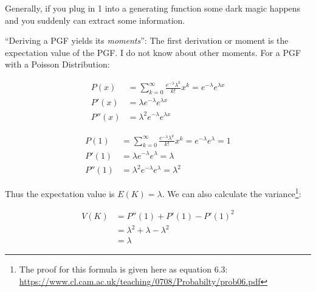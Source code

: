 Generally, if you plug in 1 into a generating function some dark magic happens and you suddenly can extract some information.

``Deriving a PGF yields its \emph{moments}'': The first derivation or moment is the expectation value of the PGF. I do not know about other moments. For a PGF with a Poisson Distribution:

\begin{align*}
  P(x) &= \sum_{k=0}^{\infty}\frac{e^{-\lambda}\lambda^k}{k!}x^k = e^{-\lambda}e^{\lambda x}\\
  P'(x) &= \lambda e^{-\lambda}e^{\lambda x}\\
  P''(x) &= \lambda^2 e^{-\lambda}e^{\lambda x}
\end{align*}

\begin{align*}
  P(1) &= \sum_{k=0}^{\infty}\frac{e^{-\lambda}\lambda^k}{k!}x^k = e^{-\lambda}e^{\lambda} = 1\\
  P'(1) &= \lambda e^{-\lambda}e^{\lambda} = \lambda\\
  P''(1) &= \lambda^2 e^{-\lambda}e^{\lambda} = \lambda^2
\end{align*}

Thus the expectation value is $E(K) = \lambda$. We can also calculate the variance\footnote{The proof for this formula is given here as equation 6.3: \url{https://www.cl.cam.ac.uk/teaching/0708/Probabilty/prob06.pdf}}:

\begin{equation*}
\begin{split}
  V(K) &= P''(1) + P'(1) - P'(1)^2\\
       &= \lambda^2 + \lambda - \lambda^2\\
       &= \lambda
\end{split}
\end{equation*}
